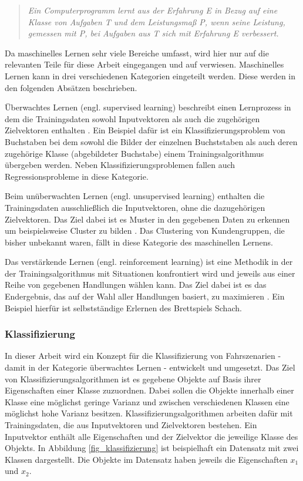 \begin{quote}
\textit{\glqq Ein Computerprogramm lernt aus der Erfahrung E in Bezug auf eine Klasse von Aufgaben T und dem Leistungsmaß P, wenn seine Leistung, gemessen mit P, bei Aufgaben aus T sich mit Erfahrung E verbessert.\grqq}
\end{quote}

Da maschinelles Lernen sehr viele Bereiche umfasst, wird hier nur auf die relevanten Teile für diese Arbeit eingegangen und auf \cite{mitchell1997machine} verwiesen. Maschinelles Lernen kann in drei verschiedenen Kategorien eingeteilt werden. Diese werden in den folgenden Absätzen beschrieben.

Überwachtes Lernen (engl. supervised learning) beschreibt einen Lernprozess in dem die Trainingsdaten sowohl Inputvektoren als auch die zugehörigen Zielvektoren enthalten \cite{bishop2006pattern}. Ein Beispiel dafür ist ein Klassifizierungsproblem von Buchstaben bei dem sowohl die Bilder der einzelnen Buchststaben als auch deren zugehörige Klasse (abgebildeter Buchstabe) einem Trainingsalgorithmus übergeben werden. Neben Klassifizierungsproblemen fallen auch Regressionsprobleme in diese Kategorie.

Beim unüberwachten Lernen (engl. unsupervised learning) enthalten die Trainingsdaten ausschließlich die Inputvektoren, ohne die dazugehörigen Zielvektoren. Das Ziel dabei ist es Muster in den gegebenen Daten zu erkennen um beispielsweise Cluster zu bilden \cite{bishop2006pattern}. Das Clustering von Kundengruppen, die bisher unbekannt waren, fällt in diese Kategorie des maschinellen Lernens.

Das verstärkende Lernen (engl. reinforcement learning) ist eine Methodik in der der Trainingsalgorithmus mit Situationen konfrontiert wird und jeweils aus einer Reihe von gegebenen Handlungen wählen kann. Das Ziel dabei ist es das Endergebnis, das auf der Wahl aller Handlungen basiert, zu maximieren \cite{sutton1998introduction}. Ein Beispiel hierfür ist selbstständige Erlernen des Brettspiels Schach.


\subsubsection{Klassifizierung}

In dieser Arbeit wird ein Konzept für die Klassifizierung von Fahrszenarien - damit in der Kategorie überwachtes Lernen - entwickelt und umgesetzt. Das Ziel von Klassifizierungsalgorithmen ist es gegebene Objekte auf Basis ihrer Eigenschaften einer Klasse zuzuordnen. Dabei sollen die Objekte innerhalb einer Klasse eine möglichst geringe Varianz und zwischen verschiedenen Klassen eine möglichst hohe Varianz besitzen. Klassifizierungsalgorithmen arbeiten dafür mit Trainingsdaten, die aus Inputvektoren und Zielvektoren bestehen. Ein Inputvektor enthält alle Eigenschaften und der Zielvektor die jeweilige Klasse des Objekts. In Abbildung \ref{fig_klassifizierung} ist beispielhaft ein Datensatz mit zwei Klassen dargestellt. Die Objekte im Datensatz haben jeweils die Eigenschaften $x_1$ und $x_2$.

